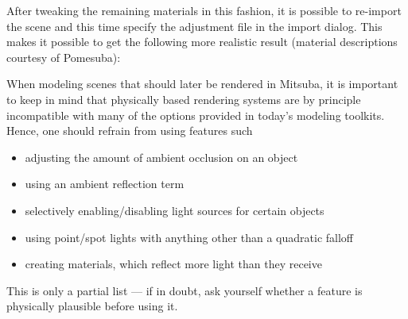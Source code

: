 After tweaking the remaining materials in this fashion, it is possible to re-import the scene and this time specify the adjustment file in the import dialog.
This makes it possible to get the following more realistic result (material descriptions courtesy of Pomesuba):
\begin{center}
\end{center}
When modeling scenes that should later be rendered in Mitsuba, it is
important to keep in mind that physically based rendering systems are by
principle incompatible with many of the options provided in today's 
modeling toolkits. Hence, one should refrain from using features such 
\begin{itemize}
\item adjusting the amount of ambient occlusion on an object 
\item using an ambient reflection term
\item selectively enabling/disabling light sources for certain
objects
\item using point/spot lights with anything other than a quadratic falloff
\item creating materials, which reflect more light than they receive
\end{itemize}
This is only a partial list --- if in doubt, ask yourself whether a feature
is physically plausible before using it.
